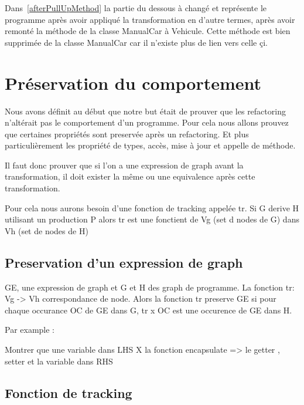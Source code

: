 \documentclass[a4paper, 10pt]{article}
\begin{document}
Dans~\ref{afterPullUpMethod} la partie du dessous à changé et représente le programme après avoir appliqué la transformation en d'autre termes, après avoir
remonté la méthode de la classe ManualCar à Vehicule. Cette méthode est bien supprimée de la classe ManualCar car il n'existe plus de lien
vers celle çi.

\section{Préservation du comportement}

Nous avons définit au début que notre but était de prouver que les refactoring n'altérait pas le comportement d'un programme. Pour cela nous allons prouvez que certaines propriétés sont preservée après un refactoring. Et plus particulièrement les propriété de types, accès, mise à jour et appelle de méthode.

Il faut donc prouver que si l'on a une expression de graph avant la transformation, il doit exister la même ou une equivalence après cette transformation.

Pour cela nous aurons besoin d'une fonction de tracking appelée tr. Si G derive H utilisant un production P alors tr est une fonctient de Vg (set d nodes de G) dans Vh (set de nodes de H)

\subsection{Preservation d'un expression de graph}
GE, une expression de graph et G et H des graph de programme. La fonction tr: Vg -> Vh correspondance de node. Alors la fonction tr preserve GE si pour chaque occurance OC de GE dans G, tr x OC est une occurence de GE dans H.

Par example :

Montrer que une variable dans LHS X la fonction encapsulate => le getter , setter et la variable dans RHS

\subsection{Fonction de tracking}
\end{document}
